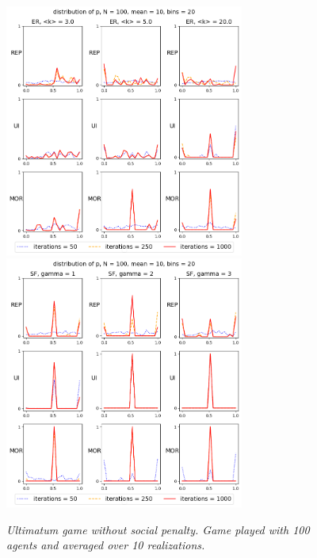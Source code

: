 \begin{figure}[H]
\begin{center}
	\includegraphics[width=0.7\textwidth]{soc1.png}
	\includegraphics[width=0.7\textwidth]{soc2.png}
 
	\caption{\emph{Ultimatum game without social penalty.  Game played with 100 agents and averaged over 10 realizations. }}
	\label{nosoc1}
\end{center}
\end{figure}
